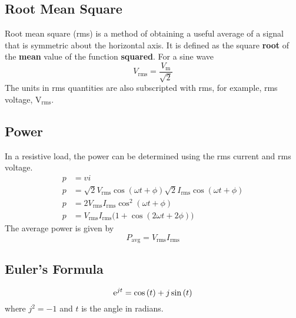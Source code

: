 \documentclass{article}
\begin{document}
\subsection{Root Mean Square}
\begin{definition}
    Root mean square (rms) is a method of obtaining a useful average of a signal that is symmetric about 
    the horizontal axis. It is defined as the square \textbf{root} of the \textbf{mean} value of the 
    function \textbf{squared}.
    For a sine wave  
    \begin{equation*}
        V_{\mathrm{rms}} = \frac{V_{\mathrm{m}}}{\sqrt{2}}
    \end{equation*}
    The units in rms quantities are also subscripted with rms, for example, rms voltage, $\si{\volt}_{\mathrm{rms}}$.
\end{definition}
\subsection{Power}
\begin{definition}
    In a resistive load, the power can be determined using the rms current and rms voltage.
    \begin{align*}
        p &= vi \\
        p &= \sqrt{2}V_{\mathrm{rms}}\cos{\left( \omega t + \phi \right)}\sqrt{2}I_{\mathrm{rms}}\cos{\left( \omega t + \phi \right)} \\
        p &= 2V_{\mathrm{rms}}I_{\mathrm{rms}}\cos^2{\left( \omega t + \phi \right)} \\
        p &= V_{\mathrm{rms}}I_{\mathrm{rms}}\bigl( 1 + \cos{\left( 2 \omega t + 2 \phi \right)} \bigr)
    \end{align*}
    The average power is given by
    \begin{equation*}
        P_{\mathrm{avg}} = V_{\mathrm{rms}}I_{\mathrm{rms}}
    \end{equation*}
\end{definition}
\subsection{Euler's Formula}
\begin{theorem}\label{theorem:eulers_formula}
    \begin{equation*}
        \mathrm{e}^{jt} = \cos{\left( t \right)} + j \sin{\left( t \right)}
    \end{equation*}
    where $j^2=-1$ and $t$ is the angle in radians.
\end{theorem}
\end{document}
